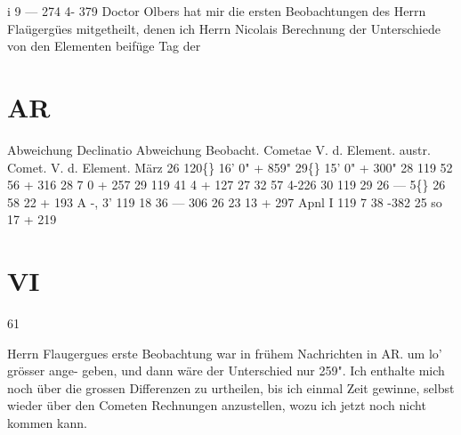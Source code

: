\documentclass[12pt,a4paper]{article}
\newcommand{\degree}{\textdegree}
\begin{document}
i 
9 
---  274 
4-  379 
Doctor  Olbers  hat  mir  die  ersten  Beobachtungen  des  Herrn  Flaügergües  mitgetheilt,   denen  ich 
Herrn  Nicolais  Berechnung  der  Unterschiede  von  den  Elementen  beifüge 
Tag  der 

\section*{AR}
Abweichung 
Declinatio 
Abweichung 
Beobacht. 
Cometae 
V.  d.  Element. austr.  Comet. V.  d.  Element. 
März    26 
120\degree\{\}  16'     0" 
+  859" 
29\degree\{\}  15'     0" 
+  300" 
28 
119    52    56 
+  316 
28      7      0 
+  257 
29 
119    41      4 
+  127 
27    32    57 
4-226 
30 
119    29    26 
---    5\degree\{\} 
26    58    22 
+  193 
A        -,     3' 
119     18    36 
---  306 
26    23     13 
+  297 
Apnl     I 
119      7    38 
-382 
25     so     17 
+  219 

\section*{VI}
61 


\newpage
Herrn  Flaugergues  erste  Beobachtung  war  in  frühem  Nachrichten  in  AR.  um  lo'  grösser  ange- 
geben, und  dann  wäre  der  Unterschied  nur  259".  Ich  enthalte  mich  noch  über  die  grossen  Differenzen 
zu  urtheilen,  bis  ich  einmal  Zeit  gewinne,  selbst  wieder  über  den  Cometen  Rechnungen  anzustellen, 
wozu  ich  jetzt  noch  nicht  kommen  kann. 
\end{document}
